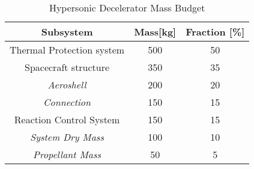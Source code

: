 \begin{table}[H]
	\caption{Hypersonic Decelerator Mass Budget}
	\begin{tabular}{|c|c|c|}
    \hline
    Subsystem        					& Mass[kg] 	& Fraction [\%] \\ \hline \hline
    Thermal Protection system	& 500				& 50 						\\ \hline 
		Spacecraft structure			& 350				& 35						\\ \hline
		\textit{Aeroshell}				& 200				& 20 						\\ \hline
		\textit{Connection}				& 150				& 15						\\ \hline
		Reaction Control System		& 150				& 15						\\ \hline
		\textit{System Dry Mass}	& 100				& 10						\\ \hline
		\textit{Propellant Mass}	& 50				& 5							\\ \hline
		
    \end{tabular}
    \label{tab:MassBudget}
\end{table}



